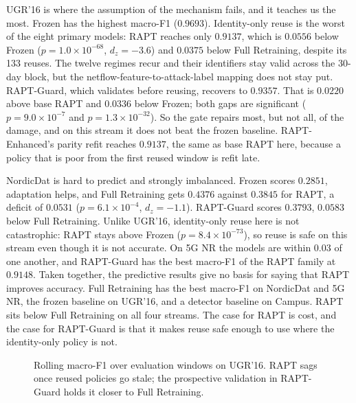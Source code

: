 UGR'16 is where the assumption of the mechanism fails, and it teaches us the most. Frozen
has the highest macro-F1 ($0.9693$). Identity-only reuse is the worst of the eight
primary models: RAPT reaches only $0.9137$, which is $0.0556$ below Frozen
($p = 1.0 \times 10^{-68}$, $d_z = -3.6$) and $0.0375$ below Full Retraining, despite its
133 reuses. The twelve regimes recur and their identifiers stay valid across the 30-day
block, but the netflow-feature-to-attack-label mapping does not stay put. RAPT-Guard,
which validates before reusing, recovers to $0.9357$. That is $0.0220$ above base RAPT
and $0.0336$ below Frozen; both gaps are significant ($p = 9.0 \times 10^{-7}$ and
$p = 1.3 \times 10^{-32}$). So the gate repairs most, but not all, of the damage, and on
this stream it does not beat the frozen baseline. RAPT-Enhanced's parity refit reaches
$0.9137$, the same as base RAPT here, because a policy that is poor from the first reused
window is refit late.

NordicDat is hard to predict and strongly imbalanced. Frozen scores $0.2851$, adaptation
helps, and Full Retraining gets $0.4376$ against $0.3845$ for RAPT, a deficit of $0.0531$
($p = 6.1 \times 10^{-4}$, $d_z = -1.1$). RAPT-Guard scores $0.3793$, $0.0583$ below Full
Retraining. Unlike UGR'16, identity-only reuse here is not catastrophic: RAPT stays above
Frozen ($p = 8.4 \times 10^{-73}$), so reuse is safe on this stream even though it is not
accurate. On 5G NR the models are within $0.03$ of one another, and RAPT-Guard has the
best macro-F1 of the RAPT family at $0.9148$. Taken together, the predictive results give
no basis for saying that RAPT improves accuracy. Full Retraining has the best macro-F1 on
NordicDat and 5G NR, the frozen baseline on UGR'16, and a detector baseline on Campus.
RAPT sits below Full Retraining on all four streams. The case for RAPT is cost, and the
case for RAPT-Guard is that it makes reuse safe enough to use where the identity-only
policy is not.

\begin{figure}[t]
\centering
{}
\caption{Rolling macro-F1 over evaluation windows on UGR'16. RAPT sags once reused
policies go stale; the prospective validation in RAPT-Guard holds it closer to Full
Retraining.}
\label{fig:ugr_rolling}
\end{figure}


